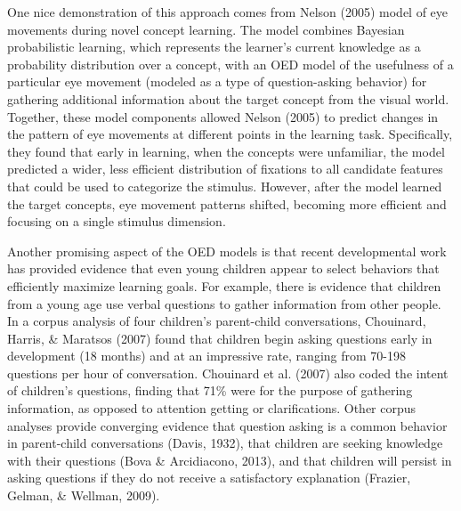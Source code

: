 \documentclass[a4paper,man,apacite,floatsintext]{apa6}
\begin{document}
One nice demonstration of this approach comes from Nelson (2005) model
of eye movements during novel concept learning. The model combines
Bayesian probabilistic learning, which represents the learner's current
knowledge as a probability distribution over a concept, with an OED
model of the usefulness of a particular eye movement (modeled as a type
of question-asking behavior) for gathering additional information about
the target concept from the visual world. Together, these model
components allowed Nelson (2005) to predict changes in the pattern of
eye movements at different points in the learning task. Specifically,
they found that early in learning, when the concepts were unfamiliar,
the model predicted a wider, less efficient distribution of fixations to
all candidate features that could be used to categorize the stimulus.
However, after the model learned the target concepts, eye movement
patterns shifted, becoming more efficient and focusing on a single
stimulus dimension.

Another promising aspect of the OED models is that recent developmental
work has provided evidence that even young children appear to select
behaviors that efficiently maximize learning goals. For example, there
is evidence that children from a young age use verbal questions to
gather information from other people. In a corpus analysis of four
children's parent-child conversations, Chouinard, Harris, \& Maratsos
(2007) found that children begin asking questions early in development
(18 months) and at an impressive rate, ranging from 70-198 questions per
hour of conversation. Chouinard et al. (2007) also coded the intent of
children's questions, finding that 71\% were for the purpose of
gathering information, as opposed to attention getting or
clarifications. Other corpus analyses provide converging evidence that
question asking is a common behavior in parent-child conversations
(Davis, 1932), that children are seeking knowledge with their questions
(Bova \& Arcidiacono, 2013), and that children will persist in asking
questions if they do not receive a satisfactory explanation (Frazier,
Gelman, \& Wellman, 2009).
\end{document}
